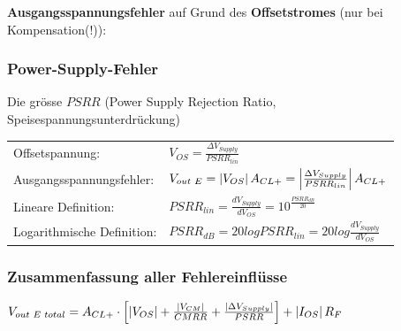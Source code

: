 			\begin{minipage}{18cm}
            	\vspace{3mm}
				\textbf{Ausgangsspannungsfehler} auf Grund des \textbf{Offsetstromes} (nur bei
				Kompensation(!)):
				\\
			\end{minipage}

		\subsubsection{Power-Supply-Fehler }
            Die grösse $PSRR$ (Power Supply Rejection Ratio, Speisespannungsunterdrückung)\\
            \begin{tabular}{ll}
            Offsetspannung:&
            $V_{OS}=\frac{\Delta V_{Supply}}{PSRR_{lin}}$\\
            Ausgangsspannungsfehler:&
            $V_{out \hspace{1mm}E}=\left|V_{OS}\right| A_{CL+}=\left| \frac{\Delta V_{Supply}}{PSRR_{lin}}\right| A_{CL+}$\\
            Lineare Definition: &
            $PSRR_{lin}=\frac{dV_{Supply}}{dV_{OS}}=10^{\frac{PSRR_{dB}}{20}}$\\
            Logarithmische Definition:&
            $PSRR_{dB}=20 log PSRR_{lin}=20 log \frac{dV_{Supply}}{dV_{OS}}$\\
            \end{tabular}
            

		\subsubsection{Zusammenfassung aller Fehlereinflüsse }
      $V_{out\hspace{1mm}E\hspace{1mm}total}=A_{CL+}\cdot\left[\left|V_{OS}\right|+\frac{\left|V_{CM}\right|}{CMRR}
            	+\frac{\left|\Delta V_{Supply}\right|}{PSRR}\right]+\left|I_{OS}\right|R_F$\\

